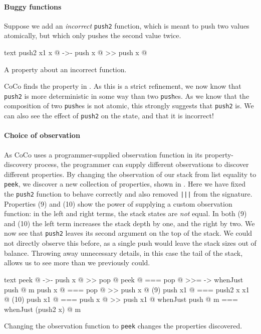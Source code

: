 \paragraph{Buggy functions}
Suppose we add an \emph{incorrect} \verb|push2| function, which is
meant to push two values atomically, but which only pushes the second
value twice.

\begin{listing}
\centering
\begin{cminted}{text}
push2 x1 x @  ->-  push x @ >> push x @
\end{cminted}
\caption{A property about an incorrect function.}\label{lst:lockstack3}
\end{listing}

CoCo finds the property in .  As this is a strict
refinement, we now know that \verb|push2| is more deterministic in
some way than two \verb|push|es.  As we know that the composition of
two \verb|push|es is not atomic, this strongly suggests that
\verb|push2| is.  We can also see the effect of \verb|push2| on the
state, and that it is incorrect!

\paragraph{Choice of observation}
As CoCo uses a programmer-supplied observation function in its
property-discovery process, the programmer can supply different
observations to discover different properties.  By changing the
observation of our stack from list equality to \verb|peek|, we
discover a new collection of properties, shown in
.  Here we have fixed the \verb|push2| function
to behave correctly and also removed \verb#|||# from the signature.
Properties (9) and (10) show the power of supplying a custom
observation function: in the left and right terms, the stack states
are \emph{not} equal.  In both (9) and (10) the left term increases
the stack depth by one, and the right by two.  We now see that
\verb|push2| leaves its second argument on the top of the stack.  We
could not directly observe this before, as a single push would leave
the stack sizes out of balance.  Throwing away unnecessary details, in
this case the tail of the stack, allows us to see more than we
previously could.

\begin{listing}
\centering
\begin{cminted}{text}
           peek @  ->-  push x @ >> pop @
           peek @  ===  pop @ >>= \m -> whenJust push @ m
         push x @  ===  pop @ >> push x @
(9)     push x1 @  ===  push2 x x1 @
(10)    push x1 @  ===  push x @ >> push x1 @
whenJust push @ m  ===  whenJust (push2 x) @ m
\end{cminted}
\caption[Changing the obervation function changes the properties discovered.]{Changing the observation function to \texttt{peek} changes the properties discovered.}\label{lst:lockstack4}
\end{listing}

